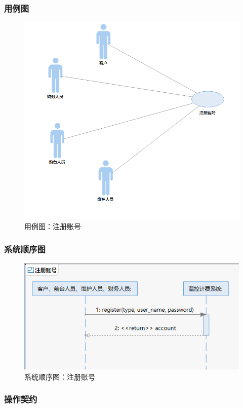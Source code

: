 \documentclass[blue,normal,cn]{elegantnote}
\begin{document}
\subsubsection{用例图}

\begin{figure}[H]
    \centering
    \includegraphics[width=.5\textwidth]{fig/276005.png}
    \caption{用例图：注册账号}
    \label{fig:276005}
\end{figure}

\subsubsection{系统顺序图}

\begin{figure}[H]
    \centering
    \includegraphics[width=.8\textwidth]{fig/276006.png}
    \caption{系统顺序图：注册账号}
    \label{fig:276006}
\end{figure}

\subsubsection{操作契约}
\end{document}
